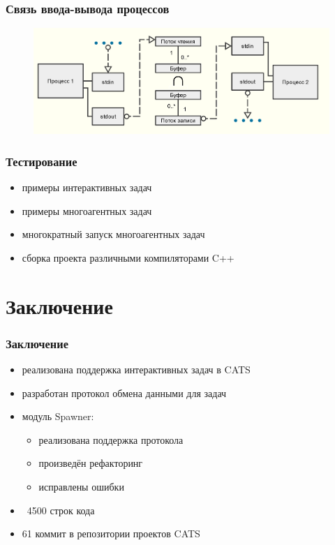 \documentclass{beamer}
\begin{document}
\begin{frame}
  \frametitle{Связь ввода-вывода процессов}
  \begin{figure}[htb]
  \centering
  \includegraphics[width=\textwidth,keepaspectratio]{./img/data_flow.png}
  \label{ai_contest_problem}
  \end{figure}
\end{frame}

\begin{frame}
  \frametitle{Тестирование}
  \begin{itemize}
  \item примеры интерактивных задач
  \item примеры многоагентных задач
  \item многократный запуск многоагентных задач
  \item сборка проекта различными компиляторами C++
  \end{itemize}
\end{frame}

\section{Заключение}
\begin{frame}
  \frametitle{Заключение}
  \begin{itemize}
    \item реализована поддержка интерактивных задач в CATS
    \item разработан протокол обмена данными для задач
    \item модуль Spawner:
    \begin{itemize}
    \item реализована поддержка протокола
    \item произведён рефакторинг
    \item исправлены ошибки
    \end{itemize}
    \item ~4500 строк кода
    \item 61 коммит в репозитории проектов CATS
  \end{itemize}
\end{frame}
\end{document}
